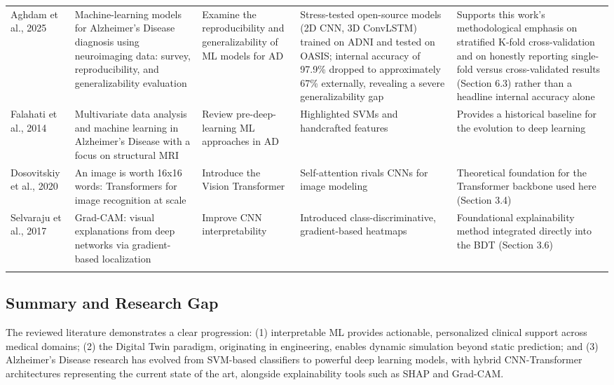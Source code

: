 \documentclass[pdflatex,sn-mathphys-num]{sn-jnl}%
\theoremstyle{thmstyleone}%
\theoremstyle{thmstyletwo}%
\theoremstyle{thmstylethree}%
\begin{document}
\begin{table}
\begin{tabular}{@{}p{0.10\textheight}p{0.17\textheight}p{0.15\textheight}p{0.27\textheight}p{0.18\textheight}@{}}
Aghdam et al., 2025 \cite{bib27} & Machine-learning models for Alzheimer's Disease diagnosis using neuroimaging data: survey, reproducibility, and generalizability evaluation & Examine the reproducibility and generalizability of ML models for AD & Stress-tested open-source models (2D CNN, 3D ConvLSTM) trained on ADNI and tested on OASIS; internal accuracy of 97.9\% dropped to approximately 67\% externally, revealing a severe generalizability gap & Supports this work's methodological emphasis on stratified K-fold cross-validation and on honestly reporting single-fold versus cross-validated results (Section 6.3) rather than a headline internal accuracy alone \\
\addlinespace
Falahati et al., 2014 \cite{bib18} & Multivariate data analysis and machine learning in Alzheimer's Disease with a focus on structural MRI & Review pre-deep-learning ML approaches in AD & Highlighted SVMs and handcrafted features & Provides a historical baseline for the evolution to deep learning \\
\addlinespace
Dosovitskiy et al., 2020 \cite{bib19} & An image is worth 16x16 words: Transformers for image recognition at scale & Introduce the Vision Transformer & Self-attention rivals CNNs for image modeling & Theoretical foundation for the Transformer backbone used here (Section 3.4) \\
\addlinespace
Selvaraju et al., 2017 \cite{bib20} & Grad-CAM: visual explanations from deep networks via gradient-based localization & Improve CNN interpretability & Introduced class-discriminative, gradient-based heatmaps & Foundational explainability method integrated directly into the BDT (Section 3.6) \\
\addlinespace
\botrule
\end{tabular}
\end{table}
\FloatBarrier

\subsection{Summary and Research Gap}\label{sec2_4}

The reviewed literature demonstrates a clear progression: (1) interpretable ML provides actionable, personalized clinical support across medical domains; (2) the Digital Twin paradigm, originating in engineering, enables dynamic simulation beyond static prediction; and (3) Alzheimer's Disease research has evolved from SVM-based classifiers to powerful deep learning models, with hybrid CNN-Transformer architectures representing the current state of the art, alongside explainability tools such as SHAP and Grad-CAM.
\end{document}
